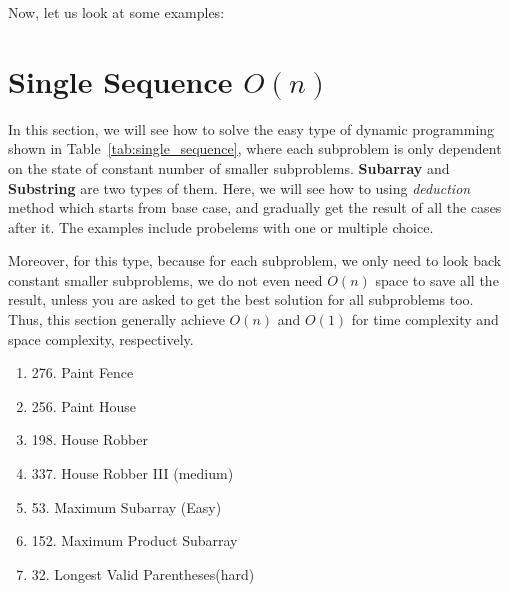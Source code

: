 \documentclass[../main.tex]{subfiles}
\begin{document}


Now, let us look at some examples: 
\section{Single Sequence $O(n)$}
\label{sec_single_n}
In this section, we will see how to solve the easy type of dynamic programming shown in Table~\ref{tab:single_sequence}, where each subproblem is only dependent on the state of constant number of smaller subproblems. \textbf{Subarray} and \textbf{Substring} are two types of them. Here, we will see how to using \textit{deduction} method which starts from base case, and gradually get the result of all the cases after it. The examples include probelems with one or multiple choice.

Moreover, for this type, because for each subproblem, we only need to look back constant smaller subproblems, we do not even need $O(n)$ space to save all the result, unless you are asked to get the best solution for all subproblems too. Thus, this section generally achieve $O(n)$ and $O(1)$ for time complexity and space complexity, respectively. 
\begin{enumerate}
    \item 276. Paint Fence
    \item 256. Paint House
    \item 198. House Robber
    \item 337. House Robber III (medium)
    \item 53. Maximum Subarray (Easy) 
    \item 152. Maximum Product Subarray
    \item 32. Longest Valid Parentheses(hard)
\end{enumerate}
\end{document}
